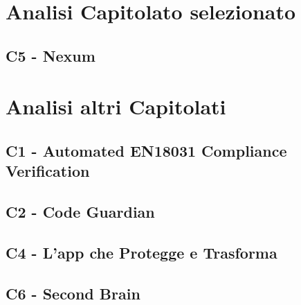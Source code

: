 \documentclass[a4paper,12pt]{article}
\begin{document}
\section{Analisi Capitolato selezionato}
\subsection{C5 - Nexum}

\section{Analisi altri Capitolati}
\subsection{C1 - Automated EN18031 Compliance Verification}
\subsection{C2 - Code Guardian}
\subsection{C4 - L'app che Protegge e Trasforma}
\subsection{C6 - Second Brain}
\end{document}
